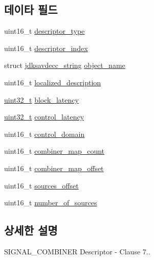 \subsection*{데이타 필드}
\begin{DoxyCompactItemize}
\item 
uint16\+\_\+t \hyperlink{structjdksavdecc__descriptor__signal__combiner_ab7c32b6c7131c13d4ea3b7ee2f09b78d}{descriptor\+\_\+type}
\item 
uint16\+\_\+t \hyperlink{structjdksavdecc__descriptor__signal__combiner_a042bbc76d835b82d27c1932431ee38d4}{descriptor\+\_\+index}
\item 
struct \hyperlink{structjdksavdecc__string}{jdksavdecc\+\_\+string} \hyperlink{structjdksavdecc__descriptor__signal__combiner_a7d1f5945a13863b1762fc6db74fa8f80}{object\+\_\+name}
\item 
uint16\+\_\+t \hyperlink{structjdksavdecc__descriptor__signal__combiner_a0926f846ca65a83ad5bb06b4aff8f408}{localized\+\_\+description}
\item 
\hyperlink{parse_8c_a6eb1e68cc391dd753bc8ce896dbb8315}{uint32\+\_\+t} \hyperlink{structjdksavdecc__descriptor__signal__combiner_ae2e9f0088d5e900b610d1b2818dfc559}{block\+\_\+latency}
\item 
\hyperlink{parse_8c_a6eb1e68cc391dd753bc8ce896dbb8315}{uint32\+\_\+t} \hyperlink{structjdksavdecc__descriptor__signal__combiner_ab2bd4639caaf9a8078b68368afbd63b6}{control\+\_\+latency}
\item 
uint16\+\_\+t \hyperlink{structjdksavdecc__descriptor__signal__combiner_a8937b22996b7c28ae209f29fe777f03a}{control\+\_\+domain}
\item 
uint16\+\_\+t \hyperlink{structjdksavdecc__descriptor__signal__combiner_af34fb15a884222f9ffe5dd2d22e4e701}{combiner\+\_\+map\+\_\+count}
\item 
uint16\+\_\+t \hyperlink{structjdksavdecc__descriptor__signal__combiner_abc173ec56f2573ff69cf569647ddcfe8}{combiner\+\_\+map\+\_\+offset}
\item 
uint16\+\_\+t \hyperlink{structjdksavdecc__descriptor__signal__combiner_ac9ce4e1b642e6654d49504898dbe738d}{sources\+\_\+offset}
\item 
uint16\+\_\+t \hyperlink{structjdksavdecc__descriptor__signal__combiner_a1af3a7f3729937d5da218737ba5b2483}{number\+\_\+of\+\_\+sources}
\end{DoxyCompactItemize}


\subsection{상세한 설명}
S\+I\+G\+N\+A\+L\+\_\+\+C\+O\+M\+B\+I\+N\+ER Descriptor -\/ Clause 7.. 

